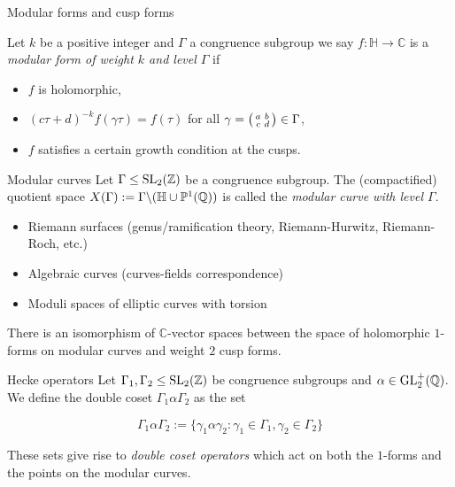 \begin{frame}{Modular forms and cusp forms}
\begin{definition}
Let $k$ be a positive integer and $\Gamma$ a congruence subgroup we say $f: \mathbb{H} \rightarrow \mathbb{C}$ is a \textit{modular form of weight $k$ and level $\Gamma$} if

\begin{itemize}
\item $f$ is holomorphic,
\item $(c\tau + d)^{-k} f(\gamma \tau) = f(\tau) $ for all $\gamma = \begin{psmallmatrix} a & b \\ c & d \end{psmallmatrix} \in \Gamma$,
\item $f$ satisfies a certain growth condition at the cusps.
\end{itemize}
\end{definition}
\end{frame}

\begin{frame}{Modular curves}
Let $\Gamma \leq \operatorname{SL}_2(\mathbb{Z})$ be a congruence subgroup. The (compactified) quotient space $X(\Gamma) := \Gamma \backslash (\mathbb{H} \cup \mathbb{P}^1(\mathbb{Q}))$ is called the \textit{modular curve with level $\Gamma$}.

\begin{itemize}
\item Riemann surfaces (genus/ramification theory, Riemann-Hurwitz, Riemann-Roch, etc.)
\item Algebraic curves (curves-fields correspondence)
\item Moduli spaces of elliptic curves with torsion
\end{itemize}

\begin{theorem}
There is an isomorphism of $\mathbb{C}$-vector spaces between the space of holomorphic $1$-forms on modular curves and weight $2$ cusp forms.
\end{theorem}
\end{frame}

\begin{frame}{Hecke operators}
Let $\Gamma_1,\Gamma_2 \leq \operatorname{SL}_2(\mathbb{Z})$ be congruence subgroups and $\alpha \in \operatorname{GL}_2^+(\mathbb{Q})$. We define the double coset $\Gamma_1 \alpha \Gamma_2$ as the set

\[
\Gamma_1 \alpha \Gamma_2 := \{ \gamma_1 \alpha \gamma_2: \gamma_1 \in \Gamma_1, \gamma_2 \in \Gamma_2 \}
\]

These sets give rise to \textit{double coset operators} which act on both the $1$-forms and the points on the modular curves.

\end{frame}

